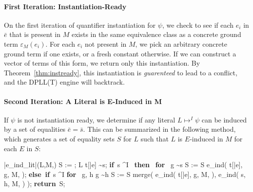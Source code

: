 \documentclass{llncs}
\def\IF{\qtab\keyword{if}\ }
\def\THEN{\ \keyword{then}\ }
\def\ELSEIF{\untab\qtab\keyword{else if}\ }
\def\FI{\untab}
\def\RETURN{\keyword{return}\ }
\def\ENDPROC{\untab}
\def\DOFOR{\qtab\keyword{for}\ }
\def\ENDFOR{\untab}
\def\keyword#1{\mbox{\normalshape\bf #1}}
\begin{document}
\begin{comment}
On the first iteration, we return the instantiation $\varepsilon_M( \bar{e} )$ if and only if $\psi$ is instantiation-ready.
On the second iteration, we determine if there exists a set of terms $\bar{s}$ such that we can determine that at least one of $L_1[\bar{e}] \ldots L_n[\bar{e}]$ is $(\bar{s} = \bar{e})$-induced in $M$.
On the third iteration, we will search for equality-ambiguous pairs of terms $t[\bar{e}]$ and $s$ in the same equivalence classes.  
Specifically, we will construct an instantiation $\bar{s}$ such that an equality between a subterm position of $t[\bar{e}]$ and $s$ is induced by $\bar{s} = \bar{e}$ on this step.
On the fourth iteration, we find a set of terms $\bar{s}$ that induce at least one equality between a pair of terms $t[\bar{e}]$ and $g$.
Note that this step is roughly equivalent to basic E-matching.
\end{comment}

\paragraph{First Iteration: Instantiation-Ready}

On the first iteration of quantifier instantiation for $\psi$, we check to see if each $e_i$ in $\bar{e}$ that is present in $M$ exists in the same equivalence class as a concrete ground term $\varepsilon_M(e_i)$.
For each $e_i$ not present in $M$, we pick an arbitrary concrete ground term if one exists, or a fresh constant otherwise.
If we can construct a vector of terms of this form, we return only this instantiation.
By Theorem~\ref{thm:instready}, this instantiation is \emph{guarenteed} to lead to a conflict, and the DPLL(T) engine will backtrack.

\paragraph{Second Iteration: A Literal is E-Induced in M}

If $\psi$ is not instantiation ready, we determine if any literal $L \mapsto^I \psi$ can be induced by a set of equalities $\bar{e} = \bar{s}$.
This can be summarized in the following method, which generates a set of equality sets $S$ for $L$ such that $L$ is $E$-induced in $M$ for each $E$ in $S$:

\begin{minipage}[t]{.4\linewidth}
\begin{program}
\PROC |e\_ind\_lit|(L,M,\psi) \BODY
  S := \emptyset;
  L  t[\bar{e}] \sim s;
  \IF s \mapsto^I \emptyset \THEN
    \DOFOR {} g \sim s
      S := S \cup e\_ind( t[\bar{e}], g, M, \psi );
    \ENDFOR
  \ELSEIF s \mapsto^I \psi
    \DOFOR {} g, h  g \sim h
      S := S \cup merge( e\_ind( t[\bar{e}], g, M, \psi ), e\_ind( s, h, M, \psi ) );
    \ENDFOR 
  \FI
  \RETURN S;
\ENDPROC
\end{program}
\end{minipage}
\end{document}
